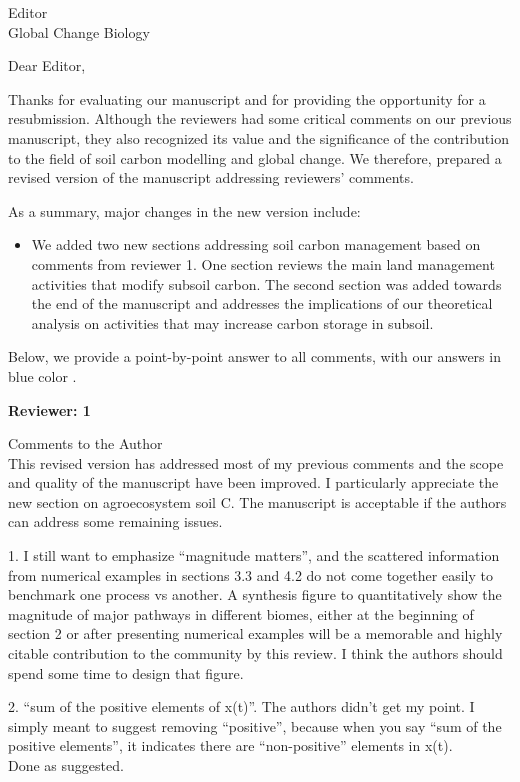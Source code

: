 \documentclass[11pt]{bgcletter}
\newcommand{\answer}[1] {
{\color{cyan} #1}
}
\begin{document}
\begin{letter}{Editor\\
   Global Change Biology
}
\opening{Dear Editor,}
Thanks for evaluating our manuscript and for providing the opportunity for a resubmission. Although the reviewers had some critical comments on our previous manuscript, they also recognized its value and the significance of the contribution to the field of soil carbon modelling and global change. We therefore, prepared a revised version of the manuscript addressing reviewers' comments. 

As a summary, major changes in the new version include: 
\begin{itemize}
\item We added two new sections addressing soil carbon management based on comments from reviewer 1. One section reviews the main land management activities that modify subsoil carbon. The second section was added towards the end of the manuscript and addresses the implications of our theoretical analysis on activities that may increase carbon storage in subsoil. 
\end{itemize}

Below, we provide a point-by-point answer to all comments, with  \answer{our answers in blue color}.

\newpage

\textbf{Reviewer: 1}

Comments to the Author \\
This revised version has addressed most of my previous comments and the scope and quality of the manuscript have been improved. I particularly appreciate the new section on agroecosystem soil C. The manuscript is acceptable if the authors can address some remaining issues.

1. I still want to emphasize ``magnitude matters'', and the scattered information from numerical examples in sections 3.3 and 4.2 do not come together easily to benchmark one process vs another. A synthesis figure to quantitatively show the magnitude of major pathways in different biomes, either at the beginning of section 2 or after presenting numerical examples will be a memorable and highly citable contribution to the community by this review. I think the authors should spend some time to design that figure.

2. ``sum of the positive elements of x(t)''. The authors didn't get my point. I simply meant to suggest removing ``positive'', because when you say ``sum of the positive elements'', it indicates there are ``non-positive'' elements in x(t). \\
\answer{Done as suggested.}


\end{letter}
\end{document}
